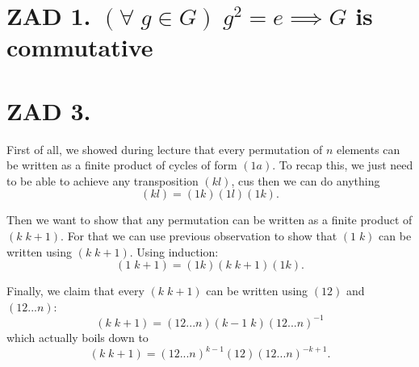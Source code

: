 \documentclass{article}
\begin{document}
\section*{ZAD 1. $(\forall\;g\in G)\;g^2=e\implies G$ is commutative}

\section*{ZAD 3.}

First of all, we showed during lecture that every permutation of $n$ elements can be written as a finite product of cycles of form $(1a)$. To recap this, we just need to be able to achieve any transposition $(kl)$, cus then we can do anything
$$(kl)=(1k)(1l)(1k).$$

Then we want to show that any permutation can be written as a finite product of $(k\; k+1)$. For that we can use previous observation to show that $(1\;k)$ can be written using $(k\;k+1)$. Using induction:
$$(1\;k+1)=(1k)(k\;k+1)(1k).$$

Finally, we claim that every $(k\;k+1)$ can be written using $(12)$ and $(12...n)$:
$$(k\;k+1)=(12...n)(k-1\;k)(12...n)^{-1}$$
which actually boils down to
$$(k\;k+1)=(12...n)^{k-1}(12)(12...n)^{-k+1}.$$
\end{document}
